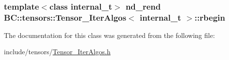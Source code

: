 \subsubsection[{\texorpdfstring{rbegin}{rbegin}}]{\setlength{\rightskip}{0pt plus 5cm}template$<$class internal\+\_\+t$>$ {\bf nd\+\_\+rend} {\bf B\+C\+::tensors\+::\+Tensor\+\_\+\+Iter\+Algos}$<$ internal\+\_\+t $>$\+::rbegin}\hypertarget{classBC_1_1tensors_1_1Tensor__IterAlgos_a10c1cb1d7095d33b9cc549aa44e98fec}{}\label{classBC_1_1tensors_1_1Tensor__IterAlgos_a10c1cb1d7095d33b9cc549aa44e98fec}


The documentation for this class was generated from the following file\+:\begin{DoxyCompactItemize}
\item 
include/tensors/\hyperlink{Tensor__IterAlgos_8h}{Tensor\+\_\+\+Iter\+Algos.\+h}\end{DoxyCompactItemize}
